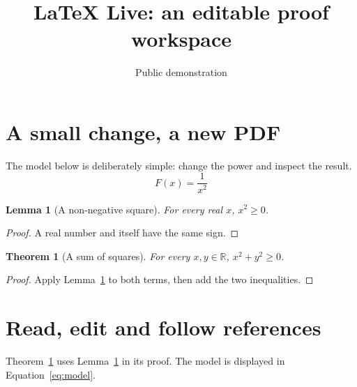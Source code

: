 \documentclass[11pt]{article}
\title{LaTeX Live: an editable proof workspace}
\author{Public demonstration}
\date{}
\newtheorem{lemma}{Lemma}
\newtheorem{theorem}{Theorem}
\begin{document}
\maketitle
\section{A small change, a new PDF}
The model below is deliberately simple: change the power and inspect the result.
\begin{equation}\label{eq:model}
 F(x) = \frac{1}{x^2}
\end{equation}
\begin{lemma}[A non-negative square]\label{lem:square}
For every real $x$, $x^2\geq0$.
\end{lemma}
\begin{proof}
A real number and itself have the same sign.
\end{proof}
\begin{theorem}[A sum of squares]\label{thm:sum}
For every $x,y\in\mathbb{R}$, $x^2+y^2\geq0$.
\end{theorem}
\begin{proof}
Apply Lemma~\ref{lem:square} to both terms, then add the two inequalities.
\end{proof}
\section{Read, edit and follow references}
Theorem~\ref{thm:sum} uses Lemma~\ref{lem:square} in its proof.
The model is displayed in Equation~\eqref{eq:model}.
\end{document}
